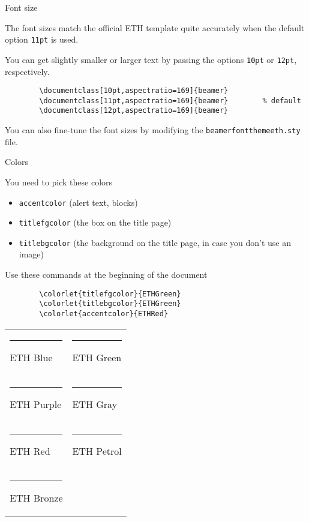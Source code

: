\documentclass[11pt,aspectratio=169]{beamer}
\begin{document}
\begin{frame}[fragile]{Font size}

	The font sizes match the official ETH template quite accurately when the default option \verb+11pt+ is used.
	
	\bigskip
	
	You can get slightly smaller or larger text by passing the options \verb+10pt+ or \verb+12pt+, respectively.
	\begin{verbatim}
		\documentclass[10pt,aspectratio=169]{beamer}
		\documentclass[11pt,aspectratio=169]{beamer}		% default
		\documentclass[12pt,aspectratio=169]{beamer}
	\end{verbatim}	
	
	\bigskip
	You can also fine-tune the font sizes by modifying the \verb+beamerfontthemeeth.sty+ file.

\end{frame}

\begin{frame}[fragile]{Colors}

	You need to pick these colors
	\begin{itemize}
		\item \texttt{accentcolor} (alert text, blocks)
		\item \texttt{titlefgcolor} (the box on the title page)
		\item \texttt{titlebgcolor} (the background on the title page, in case you don't use an image)
	\end{itemize}
	Use these commands at the beginning of the document
	\begin{verbatim}
		\colorlet{titlefgcolor}{ETHGreen}
		\colorlet{titlebgcolor}{ETHGreen}
		\colorlet{accentcolor}{ETHRed}
	\end{verbatim}

	\medskip

	\begin{tabular}{ll}
	\textcolor{ETHBlue}{\rule{4mm}{3mm}} ETH Blue &
	\textcolor{ETHGreen}{\rule{4mm}{3mm}} ETH Green \\
	\textcolor{ETHPurple}{\rule{4mm}{3mm}} ETH Purple &
	\textcolor{ETHGray}{\rule{4mm}{3mm}} ETH Gray \\
	\textcolor{ETHRed}{\rule{4mm}{3mm}} ETH Red &
	\textcolor{ETHPetrol}{\rule{4mm}{3mm}} ETH Petrol \\
	\textcolor{ETHBronze}{\rule{4mm}{3mm}} ETH Bronze
	\end{tabular}
	
\end{frame}
\end{document}
